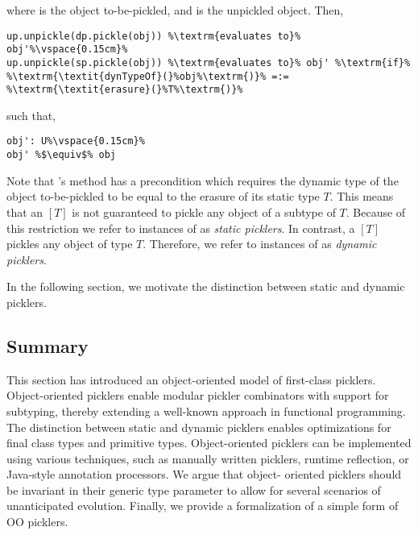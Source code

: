 {\begin{defn}
\noindent where  is the object to-be-pickled, and  is the unpickled
object. Then,

\begin{lstlisting}[escapechar=\%]
up.unpickle(dp.pickle(obj)) %\textrm{evaluates to}% obj'%\vspace{0.15cm}%
up.unpickle(sp.pickle(obj)) %\textrm{evaluates to}% obj' %\textrm{if}% %\textrm{\textit{dynTypeOf}(}%obj%\textrm{)}% =:= %\textrm{\textit{erasure}(}%T%\textrm{)}%
\end{lstlisting}

\noindent such that,

\begin{lstlisting}[escapechar=\%]
obj': U%\vspace{0.15cm}%
obj' %$\equiv$% obj
\end{lstlisting}
\end{defn}

Note that 's  method has a precondition which
requires the dynamic type of the object to-be-pickled to be equal to the
erasure of its static type $T$. This means that an $[T]$ is not
guaranteed to pickle any object of a subtype of $T$. Because of this
restriction we refer to instances of  as {\em static picklers}.
In contrast, a $[T]$ pickles any object of type $T$. Therefore,
we refer to instances of  as {\em dynamic picklers}.

In the following section, we motivate the distinction between static and
dynamic picklers.

}

\subsection{Summary}

This section has introduced an object-oriented model of first-class picklers.
Object-oriented picklers enable modular pickler combinators with support for
subtyping, thereby extending a well-known approach in functional programming.
The distinction between static and dynamic picklers enables optimizations for
final class types and primitive types. Object-oriented picklers can be
implemented using various techniques, such as manually written picklers,
runtime reflection, or Java-style annotation processors. We argue that object-
oriented picklers should be invariant in their generic type parameter to allow
for several scenarios of unanticipated evolution. Finally, we provide a
formalization of a simple form of OO picklers.


